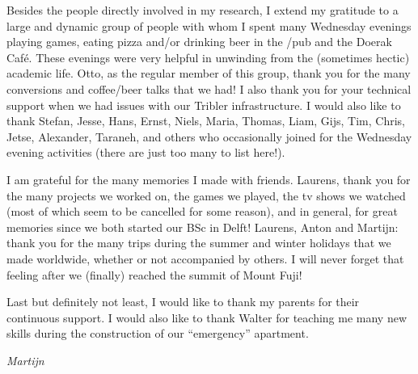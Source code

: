 Besides the people directly involved in my research, I extend my gratitude to a large and dynamic group of people with whom I spent many Wednesday evenings playing games, eating pizza and/or drinking beer in the /pub and the Doerak Café.
These evenings were very helpful in unwinding from the (sometimes hectic) academic life.
Otto, as the regular member of this group, thank you for the many conversions and coffee/beer talks that we had!
I also thank you for your technical support when we had issues with our Tribler infrastructure.
I would also like to thank Stefan, Jesse, Hans, Ernst, Niels, Maria, Thomas, Liam, Gijs, Tim, Chris, Jetse, Alexander, Taraneh, and others who occasionally joined for the Wednesday evening activities (there are just too many to list here!).

I am grateful for the many memories I made with friends.
Laurens, thank you for the many projects we worked on, the games we played, the tv shows we watched (most of which seem to be cancelled for some reason), and in general, for great memories since we both started our BSc in Delft!
Laurens, Anton and Martijn: thank you for the many trips during the summer and winter holidays that we made worldwide, whether or not accompanied by others.
I will never forget that feeling after we (finally) reached the summit of Mount Fuji!\emojifuji{}

Last but definitely not least, I would like to thank my parents for their continuous support.
I would also like to thank Walter for teaching me many new skills during the construction of our \enquote{emergency} apartment.

\begin{flushright}
{\makeatletter\itshape
    Martijn
\makeatother}
\end{flushright}
